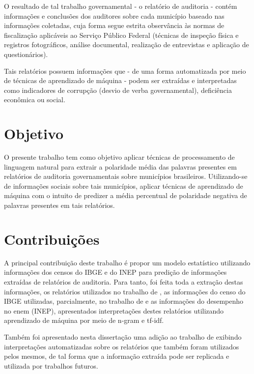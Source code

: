 O resultado de tal trabalho governamental - o relatório de auditoria - contém informações e conclusões dos auditores sobre cada município baseado nas informações coletadas, cuja forma segue estrita observância às normas de fiscalização aplicáveis ao Serviço Público Federal (técnicas de inspeção física e registros fotográficos, análise documental, realização de entrevistas e aplicação de questionários).

Tais relatórios possuem informações que - de uma forma automatizada por meio de técnicas de aprendizado de máquina - podem ser extraídas e interpretadas como indicadores de corrupção (desvio de verba governamental), deficiência econômica ou social.

\section{Objetivo}
\label{sec:objetivo}

O presente trabalho tem como objetivo aplicar técnicas de processamento de linguagem natural para extrair a polaridade média das palavras presentes em relatórios de auditoria governamentais sobre municípios brasileiros. Utilizando-se de informações sociais sobre tais municípios, aplicar técnicas de aprendizado de máquina com o intuito de predizer a média percentual de polaridade negativa de palavras presentes em tais relatórios.

\section{Contribuições}
\label{sec:contribuicoes}

A principal contribuição deste trabalho é propor um modelo estatístico utilizando informações dos censos do IBGE e do INEP para predição de informações extraídas de relatórios de auditoria. Para tanto, foi feita toda a extração destas informações, os relatórios utilizados no trabalho de \citet{FerrazFinan2008}, as informações do censo do IBGE utilizadas, parcialmente, no trabalho de \citet{Goldani2001} e as informações do desempenho no enem (INEP), apresentados interpretações destes relatórios utilizando aprendizado de máquina por meio de n-gram e tf-idf.

Também foi apresentado nesta dissertação uma adição ao trabalho de \citet{FerrazFinan2008} exibindo interpretações automatizadas sobre os relatórios que também foram utilizados pelos mesmos, de tal forma que a informação extraída pode ser replicada e utilizada por trabalhos futuros.

